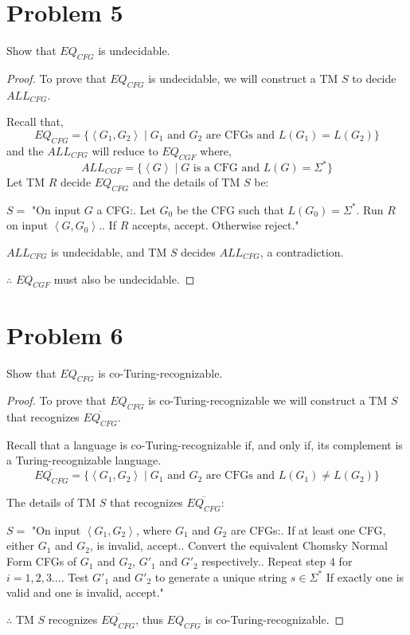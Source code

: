 \documentclass[11pt]{article}
\begin{document}
\newpage
\section*{Problem 5}

Show that $EQ_{CFG}$ is undecidable.
\begin{proof}
To prove that $EQ_{CFG}$ is undecidable, we will construct a TM $S$ to decide $ALL_{CFG}$.

\noindent
Recall that,
$$ EQ_{CFG} = \{ \left< G_{1}, G_{2} \right> \mid G_{1} \text{ and } G_{2} \text{ are CFGs and } L(G_{1}) = L(G_{2})\} $$
and the $ALL_{CFG}$ will reduce to  $EQ_{CGF}$ where, 
$$ ALL_{CGF} = \{ \left< G \right> \mid G \text{ is a CFG and } L(G) = \Sigma^{*} \}$$
Let TM $R$ decide $EQ_{CFG}$ and the details of TM $S$ be:

\noindent
$S = $ "On input $G$ a CFG:. Let $G_{0}$ be the CFG such that $L(G_{0}) = \Sigma^{*}$. Run $R$ on input $\left< G , G_{0} \right>$.. If $R$ accepts, accept. Otherwise reject."

\noindent
$ALL_{CFG}$ is undecidable, and TM $S$ decides $ALL_{CFG}$, a contradiction.

\noindent
$\therefore$ $EQ_{CGF}$ must also be undecidable.
\end{proof}

\newpage
\section*{Problem 6}

Show that $EQ_{CFG}$ is co-Turing-recognizable.

\begin{proof}
To prove that $EQ_{CFG}$ is co-Turing-recognizable we will construct a TM $S$ that recognizes $\overline{EQ_{CFG}}$.

\noindent
Recall that a language is co-Turing-recognizable if, and only if, its complement is a Turing-recognizable language.
$$ \overline{EQ_{CFG}} = \{ \left< G_{1}, G_{2} \right> \mid G_{1} \text{ and } G_{2} \text{ are CFGs and } L(G_{1}) \neq L(G_{2})\}$$

\noindent
The details of TM $S$ that recognizes $\overline{EQ_{CFG}}$:

\noindent
$S = $ "On input $\left< G_{1}, G_{2} \right>$, where $G_{1}$ and $G_{2}$ are CFGs:. If at least one CFG, either $G_{1}$ and $G_{2}$, is invalid, accept.. Convert the equivalent Chomsky Normal Form CFGs of $G_{1}$ and $G_{2}$, $G'_{1}$ and $G'_{2}$ respectively.. Repeat step $4$ for $i = 1,2,3\ldots$. Test $G'_{1}$ and $G'_{2}$ to generate a unique string $s \in \Sigma^{*}$\newline
If exactly one is valid and one is invalid, accept."

\noindent
$\therefore$ TM $S$ recognizes $\overline{EQ_{CFG}}$, thus $EQ_{CFG}$ is co-Turing-recognizable.
\end{proof}
\end{document}
